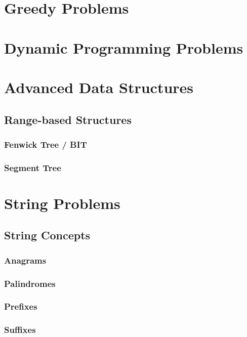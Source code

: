 \documentclass[12pt]{article}
\begin{document}
\hspace{0mm}

\section{Greedy Problems}

\hspace{0mm}

\section{Dynamic Programming Problems}

\hspace{0mm}

\section{Advanced Data Structures}
\subsection{Range-based Structures}
\subsubsection{Fenwick Tree / BIT}
\subsubsection{Segment Tree}

\hspace{0mm}

\section{String Problems}
\subsection{String Concepts}
\subsubsection{Anagrams}
\subsubsection{Palindromes}
\subsubsection{Prefixes}
\subsubsection{Suffixes}
\end{document}
